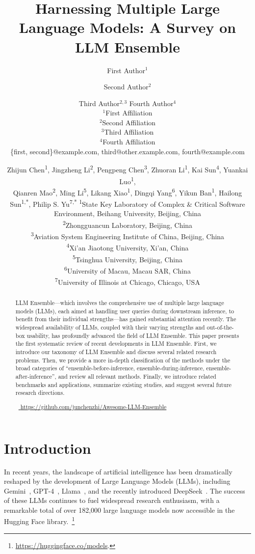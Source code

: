 \documentclass{article}
\title{\emojidizzy Harnessing Multiple Large Language Models: A Survey on LLM Ensemble}
\author{
First Author$^1$
\and
Second Author$^2$\and
Third Author$^{2,3}$\And
Fourth Author$^4$\\
\affiliations
$^1$First Affiliation\\
$^2$Second Affiliation\\
$^3$Third Affiliation\\
$^4$Fourth Affiliation\\
\emails
\{first, second\}@example.com,
third@other.example.com,
fourth@example.com
}
\author{Zhijun Chen\textsuperscript{\rm 1}, Jingzheng Li\textsuperscript{\rm 2}, Pengpeng Chen\textsuperscript{\rm 3}, Zhuoran Li\textsuperscript{\rm 1}, Kai Sun\textsuperscript{\rm 4}, 
Yuankai Luo\textsuperscript{\rm 1},  \\
Qianren Mao\textsuperscript{\rm 2}, 
Ming Li\textsuperscript{\rm 5}, 
Likang Xiao\textsuperscript{\rm 1}, 
Dingqi Yang\textsuperscript{\rm 6}, 
Yikun Ban\textsuperscript{\rm 1}, 
Hailong Sun\textsuperscript{\rm 1,*}, 
Philip S. Yu\textsuperscript{\rm 7,*}
    \affiliations
    \textsuperscript{\rm 1}State Key Laboratory of Complex \&  Critical Software Environment, Beihang University, Beijing, China\\
    \textsuperscript{\rm 2}Zhongguancun Laboratory, Beijing, China\\
    \textsuperscript{\rm 3}Aviation System Engineering Institute of China, Beijing, China\\
    \textsuperscript{\rm 4}Xi’an Jiaotong University, Xi’an, China\\
        \textsuperscript{\rm 5}Tsinghua University, Beijing, China\\
    \textsuperscript{\rm 6}University of Macau, Macau SAR, China\\
    \textsuperscript{\rm 7}University of Illinois at Chicago, Chicago, USA\\
    \emails{
    \{zhijunchen, jingzhengli, chenpp, lizhuoranget, sunkai, luoyk, xiaolik, yikunb, sunhl\}@buaa.edu.cn,  maoqr@zgclab.edu.cn, mingli\_thu@tsinghua.edu.cn,
    dingqiyang@um.edu.mo, psyu@uic.edu \\
    }  
}
\begin{document}
\maketitle

\begin{NoHyper}
\def\thefootnote{}
\end{NoHyper}



\begin{abstract}

LLM Ensemble---which involves the comprehensive use of multiple large language models (LLMs), each aimed at handling user queries during downstream inference, to benefit from their individual strengths---has gained substantial attention recently. The widespread availability of LLMs, coupled with their varying strengths and out-of-the-box usability, has profoundly advanced the field of LLM Ensemble. This paper presents the first systematic review of recent developments in LLM Ensemble. First, we introduce our taxonomy of LLM Ensemble and discuss several related research problems. Then, we provide a more in-depth classification of the methods under the broad categories of ``ensemble-before-inference, ensemble-during-inference, ensemble-after-inference'', and review all relevant methods. Finally, we introduce related benchmarks and applications, summarize existing studies, and suggest several future research directions. 


\faGithub~\href{https://github.com/junchenzhi/Awesome-LLM-Ensemble}{
  \textcolor[rgb]{0.0, 0.4039, 0.5843}{https://github.com/junchenzhi/Awesome-LLM-Ensemble}
}


\end{abstract}





\section{Introduction}
\label{Introduction}


In recent years, the landscape of artificial intelligence has been dramatically reshaped by the development of Large Language Models (LLMs), including Gemini~\cite{team2023gemini}, GPT-4~\cite{achiam2023gpt}, Llama~\cite{touvron2023llama}, and the recently introduced DeepSeek~\cite{liu2024deepseek}.
The success of these LLMs continues to fuel widespread research enthusiasm, with a remarkable total of over 182,000 large language models now accessible in the Hugging Face library.~\footnote{\url{https://huggingface.co/models}.}
\end{document}
